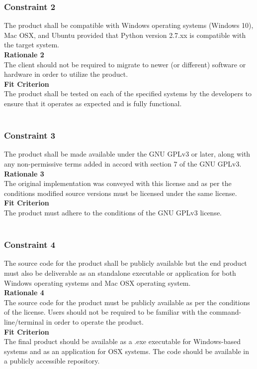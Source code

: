 \documentclass{article}
\newcommand {\PYVER}{2.7.xx }
\begin{document}
		\subsubsection*{Constraint 2} \label {constraint2}
		\indent The product shall be compatible with Windows operating systems 
		(Windows 10), Mac OSX, and Ubuntu provided that Python version \PYVER
		is compatible with the target system.\\
		\textbf{Rationale 2}\\
		\indent The client should not be required to migrate to newer (or 
		different) software or hardware in order to utilize the product.\\
		\textbf{Fit Criterion}\\
		\indent The product shall be tested on each of the specified systems by 
		the developers to ensure that it operates as expected and is fully 
		functional.\\\\
		
		\subsubsection*{Constraint 3} \label {constraint3}
		\indent The product shall be made available under the GNU GPLv3 or 
		later, along with any non-permissive terms added in accord with section 
		7 of the GNU GPLv3.\\
		\textbf {Rationale 3}\\
		\indent The original implementation was conveyed with this license and 
		as per 
		the conditions modified source versions must be licensed under the same 
		license.\\
		\textbf {Fit Criterion}\\
		\indent The product must adhere to the conditions of the GNU GPLv3 
		license.\\\\
		
		\subsubsection*{Constraint 4} \label {constraint4}
		\indent The source code for the product shall be publicly available but 
		the end product must also be deliverable as an standalone executable or 
		application for both Windows operating systems and Mac OSX operating 
		system.\\
		\textbf {Rationale 4}\\
		\indent The source code for the product must be publicly available as 
		per the conditions of the license. Users should not be required to be 
		familiar with the command-line/terminal in order to operate the 
		product.\\
		\textbf {Fit Criterion}\\
		\indent The final product should be available as a .exe executable for 
		Windows-based systems and as an application for OSX systems. The code 
		should be available in a publicly accessible repository.\\
		
\end{document}
